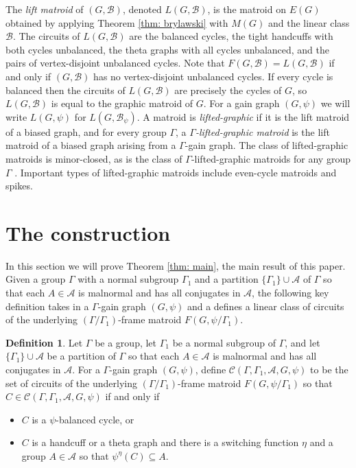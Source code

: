 \documentclass[12pt]{article}
\theoremstyle{definition}
\newtheorem{definition}[theorem]{Definition}
\newcommand{\cA}{\mathcal{A}}
\newcommand{\cB}{\mathcal{B}}
\newcommand{\cC}{\mathcal{C}}
\begin{document}
The \emph{lift matroid} of $(G, \cB)$, denoted $L(G, \cB)$, is the matroid on $E(G)$ obtained by applying Theorem \ref{thm: brylawski} with $M(G)$ and the linear class $\cB$.
The circuits of $L(G, \cB)$ are the balanced cycles, the tight handcuffs with both cycles unbalanced, the theta graphs with all cycles unbalanced, and the pairs of vertex-disjoint unbalanced cycles.
Note that $F(G, \cB) = L(G, \cB)$ if and only if $(G, \cB)$ has no vertex-disjoint unbalanced cycles.
If every cycle is balanced then the circuits of $L(G, \cB)$ are precisely the cycles of $G$, so $L(G, \cB)$ is equal to the graphic matroid of $G$.
For a gain graph $(G, \psi)$ we will write $L(G, \psi)$ for $L(G, \cB_{\psi})$.
A matroid is \emph{lifted-graphic} if it is the lift matroid of a biased graph, and for every group $\Gamma$, a \emph{$\Gamma$-lifted-graphic matroid} is the lift matroid of a biased graph arising from a $\Gamma$-gain graph.
The class of lifted-graphic matroids is minor-closed, as is the class of $\Gamma$-lifted-graphic matroids for any group $\Gamma$ \cite{Zaslavsky1991}.
Important types of lifted-graphic matroids include even-cycle matroids and spikes.









\section{The construction} \label{sec: the construction}

In this section we will prove Theorem \ref{thm: main}, the main result of this paper.
Given a group $\Gamma$ with a normal subgroup $\Gamma_1$ and a partition $\{\Gamma_1\} \cup \cA$ of $\Gamma$ so that each $A \in \cA$ is malnormal and has all conjugates in $\cA$, the following key definition takes in a $\Gamma$-gain graph $(G, \psi)$ and a defines a linear class of circuits of the underlying $(\Gamma/\Gamma_1)$-frame matroid $F(G, \psi/\Gamma_1)$.

\begin{definition} \label{def: the linear class}
Let $\Gamma$ be a group, let $\Gamma_1$ be a normal subgroup of $\Gamma$, and let $\{\Gamma_1\} \cup \cA$ be a partition of $\Gamma$ so that each $A \in \cA$ is malnormal and has all conjugates in $\cA$.
For a $\Gamma$-gain graph $(G, \psi)$, define $\cC(\Gamma, \Gamma_1, \cA, G, \psi)$ to be the set of circuits of the underlying $(\Gamma/\Gamma_1)$-frame matroid $F(G, \psi/\Gamma_1)$ so that $C \in \cC(\Gamma, \Gamma_1, \cA, G, \psi)$ if and only if 
\begin{itemize}
    \item $C$ is a $\psi$-balanced cycle, or
    \item $C$ is a handcuff or a theta graph and there is a switching function $\eta$ and a group $A \in \cA$ so that $\psi^{\eta}(C) \subseteq A$.
\end{itemize}
\end{definition}
\end{document}

